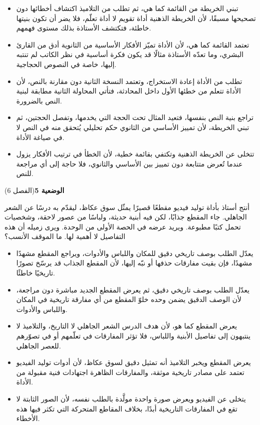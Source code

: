 \documentclass[11pt,a4paper]{article}
\begin{document}
\begin{itemize}[leftmargin=1.0cm, labelsep=6pt, itemsep=3pt, topsep=4pt, parsep=0pt]
  \item[\textbf{أ)}] تبني الخريطة من القائمة كما هي، ثم تطلب من التلاميذ اكتشاف أخطائها دون تصحيحها مسبقًا، لأن الخريطة الذهنية أداة تقويم لا أداة تعلّم، فلا يضر أن تكون بنيتها خاطئة، فتكتشف الأستاذة بذلك مستوى فهمهم.
  \item[\textbf{ب)}] تعتمد القائمة كما هي، لأن الأداة تميّز الأفكار الأساسية من الثانوية أدق من القارئ البشري، وما تعدّه الأستاذة مثالًا قد يكون فكرة أساسية في نظر الكاتب لم تنتبه إليها، خاصة في النصوص الحجاجية.
  \item[\textbf{ج)}] تطلب من الأداة إعادة الاستخراج، وتعتمد النسخة الثانية دون مقارنة بالنص، لأن الأداة تتعلم من خطئها الأول داخل المحادثة، فتأتي المحاولة الثانية مطابقة لبنية النص بالضرورة.
  \item[\textbf{د)}] تراجع بنية النص بنفسها، فتعيد المثال تحت الحجة التي يخدمها، وتفصل الحجتين، ثم تبني الخريطة، لأن تمييز الأساسي من الثانوي حكم تحليلي يُتحقق منه في النص لا في صياغة الأداة.
  \item[\textbf{هـ)}] تتخلى عن الخريطة الذهنية وتكتفي بقائمة خطية، لأن الخطأ في ترتيب الأفكار يزول عندما تُعرض متتابعة دون تمييز بين الأساسي والثانوي، فلا حاجة إلى أي مراجعة للنص.
\end{itemize}
\par\vspace{6pt}
\noindent
{\large\khatt\textbf{الوضعية 5}}\hfill{\small(الفصل 6)}\par\nopagebreak\vspace{3pt}
\setlength{\fboxsep}{7pt}\colorbox{gray!10}{\parbox{\dimexpr\linewidth-14pt}{أنتج أستاذ بأداة توليد فيديو مقطعًا قصيرًا يمثّل سوق عكاظ، ليقدّم به درسًا عن الشعر الجاهلي. جاء المقطع جذابًا، لكن فيه أبنية حديثة، ولباسًا من عصور لاحقة، وشخصيات تحمل كتبًا مطبوعة. ويريد عرضه في الحصة الأولى من الوحدة. ويرى زميله أن هذه التفاصيل لا أهمية لها. ما الموقف الأنسب؟}}\par\nopagebreak
\begin{itemize}[leftmargin=1.0cm, labelsep=6pt, itemsep=3pt, topsep=4pt, parsep=0pt]
  \item[\textbf{أ)}] يعدّل الطلب بوصف تاريخي دقيق للمكان واللباس والأدوات، ويراجع المقطع مشهدًا مشهدًا، فإن بقيت مفارقات حذفها أو نبّه إليها، لأن المقطع الجذاب قد يرسّخ تصورًا تاريخيًا خاطئًا.
  \item[\textbf{ب)}] يعدّل الطلب بوصف تاريخي دقيق، ثم يعرض المقطع الجديد مباشرة دون مراجعة، لأن الوصف الدقيق يضمن وحده خلوّ المقطع من أي مفارقة تاريخية في المكان واللباس والأدوات.
  \item[\textbf{ج)}] يعرض المقطع كما هو، لأن هدف الدرس الشعر الجاهلي لا التاريخ، والتلاميذ لا ينتبهون إلى تفاصيل الأبنية واللباس، فلا تؤثر المفارقات في تعلّمهم أو في تصوّرهم للعصر الجاهلي.
  \item[\textbf{د)}] يعرض المقطع ويخبر التلاميذ أنه تمثيل دقيق لسوق عكاظ، لأن أدوات توليد الفيديو تعتمد على مصادر تاريخية موثقة، والمفارقات الظاهرة اجتهادات فنية مقبولة من الأداة.
  \item[\textbf{هـ)}] يتخلى عن الفيديو ويعرض صورة واحدة مولَّدة بالطلب نفسه، لأن الصور الثابتة لا تقع في المفارقات التاريخية أبدًا، بخلاف المقاطع المتحركة التي تكثر فيها هذه الأخطاء.
\end{itemize}
\end{document}
